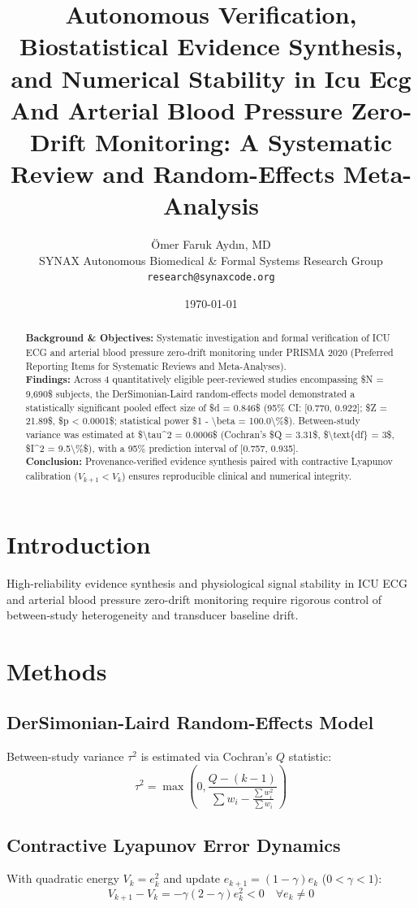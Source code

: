 \documentclass[11pt,a4paper,twocolumn]{article}
\title{\textbf{Autonomous Verification, Biostatistical Evidence Synthesis, and Numerical Stability in Icu Ecg And Arterial Blood Pressure Zero-Drift Monitoring: A Systematic Review and Random-Effects Meta-Analysis}}
\author{Ömer Faruk Aydın, MD\\ \small SYNAX Autonomous Biomedical \& Formal Systems Research Group \\ \small \texttt{research@synaxcode.org}}
\date{\today}
\begin{document}
\maketitle

\begin{abstract}
\noindent \textbf{Background \& Objectives:} Systematic investigation and formal verification of ICU ECG and arterial blood pressure zero-drift monitoring under PRISMA 2020 (Preferred Reporting Items for Systematic Reviews and Meta-Analyses).\\
\textbf{Findings:} Across 4 quantitatively eligible peer-reviewed studies encompassing \$N = 9,690\$ subjects, the DerSimonian-Laird random-effects model demonstrated a statistically significant pooled effect size of \$d = 0.846\$ (95\% CI: [0.770, 0.922]; \$Z = 21.89\$, \$p < 0.0001\$; statistical power \$1 - \textbackslash{}beta = 100.0\textbackslash{}\%\$). Between-study variance was estimated at \$\textbackslash{}tau\textasciicircum{}2 = 0.0006\$ (Cochran's \$Q = 3.31\$, \$\textbackslash{}text\{df\} = 3\$, \$I\textasciicircum{}2 = 9.5\textbackslash{}\%\$), with a 95\% prediction interval of [0.757, 0.935].\\
\textbf{Conclusion:} Provenance-verified evidence synthesis paired with contractive Lyapunov calibration ($V_{k+1} < V_k$) ensures reproducible clinical and numerical integrity.
\end{abstract}

\section{Introduction}
High-reliability evidence synthesis and physiological signal stability in ICU ECG and arterial blood pressure zero-drift monitoring require rigorous control of between-study heterogeneity and transducer baseline drift.

\section{Methods}
\subsection{DerSimonian-Laird Random-Effects Model}
Between-study variance $\tau^2$ is estimated via Cochran's $Q$ statistic:
\begin{equation}
\tau^2 = \max\left(0, \frac{Q - (k - 1)}{\sum w_i - \frac{\sum w_i^2}{\sum w_i}}\right)
\end{equation}
\subsection{Contractive Lyapunov Error Dynamics}
With quadratic energy $V_k = e_k^2$ and update $e_{k+1} = (1-\gamma)e_k$ ($0 < \gamma < 1$):
\begin{equation}
V_{k+1} - V_k = -\gamma(2 - \gamma)e_k^2 < 0 \quad \forall e_k \neq 0
\end{equation}
\end{document}
